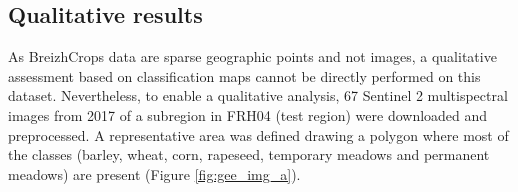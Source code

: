 \documentclass[journal,article,submit,pdftex,moreauthors]{Definitions/mdpi}
\begin{document}
\subsection{Qualitative results}

As BreizhCrops data are sparse geographic points and not images, a qualitative assessment based on classification maps cannot be directly performed on this dataset. 
Nevertheless, to enable a qualitative analysis, 67 Sentinel 2 multispectral images from 2017 of a subregion in FRH04 (test region) were downloaded and preprocessed. 
A representative area was defined drawing a polygon where most of the classes (barley, wheat, corn, rapeseed, temporary meadows and permanent meadows) are present (Figure \ref{fig:gee_img_a}). 
\end{document}
